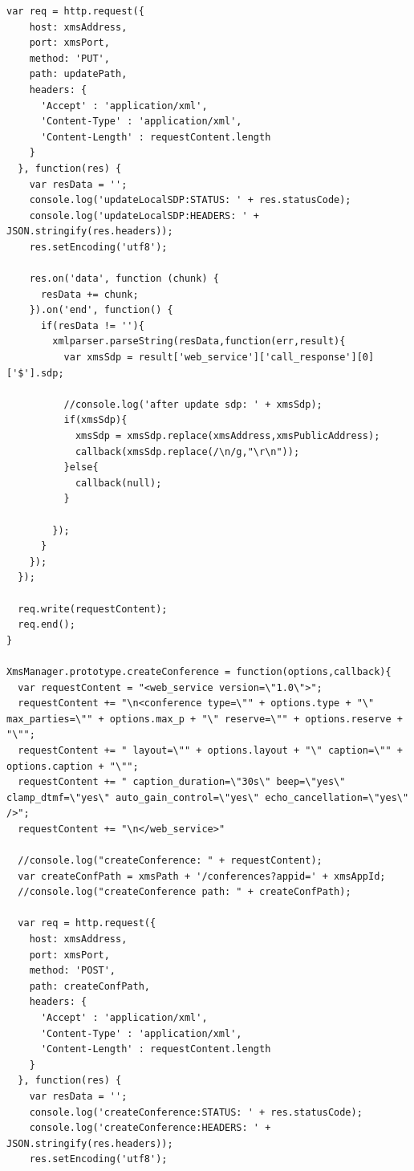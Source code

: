 \begin{appendices}
\begin{lstlisting}[caption={xms.js on Application Server},label={code:xms}]
  var req = http.request({
    host: xmsAddress,
    port: xmsPort,
    method: 'PUT',
    path: updatePath,
    headers: {
      'Accept' : 'application/xml',
      'Content-Type' : 'application/xml',
      'Content-Length' : requestContent.length
    }
  }, function(res) {
    var resData = '';
    console.log('updateLocalSDP:STATUS: ' + res.statusCode);
    console.log('updateLocalSDP:HEADERS: ' + JSON.stringify(res.headers));
    res.setEncoding('utf8');
    
    res.on('data', function (chunk) {
      resData += chunk;
    }).on('end', function() {
      if(resData != ''){
        xmlparser.parseString(resData,function(err,result){
          var xmsSdp = result['web_service']['call_response'][0]['$'].sdp;
          
          //console.log('after update sdp: ' + xmsSdp);
          if(xmsSdp){
            xmsSdp = xmsSdp.replace(xmsAddress,xmsPublicAddress);
            callback(xmsSdp.replace(/\n/g,"\r\n"));
          }else{
            callback(null);
          }
          
        });
      }
    });
  });

  req.write(requestContent);
  req.end();    
}

XmsManager.prototype.createConference = function(options,callback){
  var requestContent = "<web_service version=\"1.0\">"; 
  requestContent += "\n<conference type=\"" + options.type + "\" max_parties=\"" + options.max_p + "\" reserve=\"" + options.reserve + "\"";
  requestContent += " layout=\"" + options.layout + "\" caption=\"" + options.caption + "\"";
  requestContent += " caption_duration=\"30s\" beep=\"yes\" clamp_dtmf=\"yes\" auto_gain_control=\"yes\" echo_cancellation=\"yes\" />";
  requestContent += "\n</web_service>" 

  //console.log("createConference: " + requestContent);
  var createConfPath = xmsPath + '/conferences?appid=' + xmsAppId;
  //console.log("createConference path: " + createConfPath);
  
  var req = http.request({
    host: xmsAddress,
    port: xmsPort,
    method: 'POST',
    path: createConfPath,
    headers: {
      'Accept' : 'application/xml',
      'Content-Type' : 'application/xml',
      'Content-Length' : requestContent.length
    }
  }, function(res) {
    var resData = '';
    console.log('createConference:STATUS: ' + res.statusCode);
    console.log('createConference:HEADERS: ' + JSON.stringify(res.headers));
    res.setEncoding('utf8');
    

\end{lstlisting}
\end{appendices}
